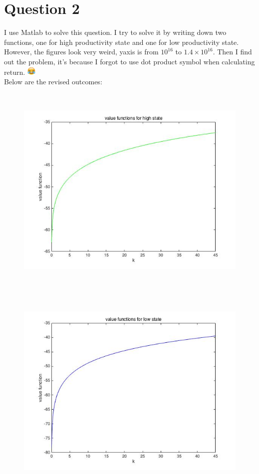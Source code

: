 \documentclass[12pt]{article}
\begin{document}
	\section{Question 2}
	I use Matlab to solve this question. I try to solve it by writing down two functions, one for high productivity state and one for low productivity state. However, the figures look very weird, yaxis is from $10^{16}$ to $1.4\times10^{16}$. Then I find out the problem, it's because I forgot to use dot product symbol when calculating return.
	\includegraphics[width=0.17in,height=0.17in]{smilelaugh}\\
	Below are the revised outcomes:\\ 
	\begin{figure}[!h]{\centering}
	\includegraphics[width=7in,height=4in]{vfnh}
	
	\end{figure}
    \begin{figure}[!h]{\centering}
	\includegraphics[width=7in,height=4in]{vfnl}
	
    \end{figure}
\end{document}
